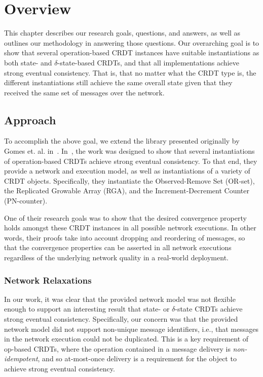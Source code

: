 \chapter{Overview}
This chapter describes our research goals, questions, and answers, as well as
outlines our methodology in answering those questions. Our overarching goal is
to show that several operation-based CRDT instances have suitable instantiations
as both state- and $\delta$-state-based CRDTs, and that all implementations
achieve strong eventual consistency. That is, that no matter what the CRDT type
is, the different instantiations still achieve the same overall state given that
they received the same set of messages over the network.

\section{Approach}
To accomplish the above goal, we extend the library presented originally by
Gomes et. al. in~\citep{gomes17}. In~\citep{gomes17}, the work was designed to
show that several instantiations of operation-based CRDTs achieve strong
eventual consistency. To that end, they provide a network and execution model,
as well as instantiations of a variety of CRDT objects. Specifically, they
instantiate the Observed-Remove Set (OR-set), the Replicated Growable Array
(RGA), and the Increment-Decrement Counter (PN-counter).

One of their research goals was to show that the desired convergence property
holds amongst these CRDT instances in all possible network executions. In other
words, their proofs take into account dropping and reordering of messages, so
that the convergence properties can be asserted in all network executions
regardless of the underlying network quality in a real-world deployment.

\subsection{Network Relaxations}
In our work, it was clear that the provided network model was not flexible
enough to support an interesting result that state- or $\delta$-state
CRDTs achieve strong eventual consistency. Specifically, our concern was that
the provided network model did not support non-unique message identifiers, i.e.,
that messages in the network execution could not be duplicated. This is a key
requirement of op-based CRDTs, where the operation contained in a message
delivery is \textit{non-idempotent}, and so at-most-once delivery is a
requirement for the object to achieve strong eventual consistency.

